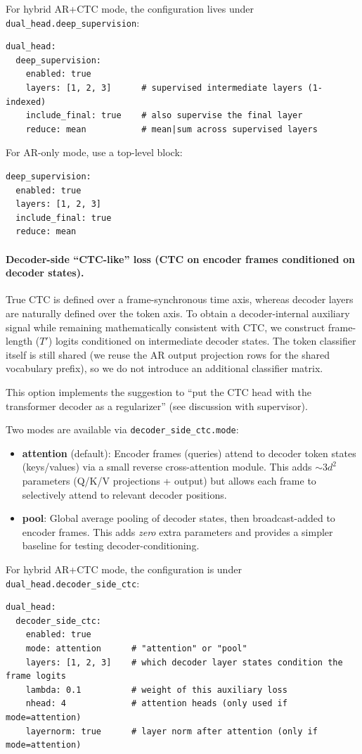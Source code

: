 For hybrid AR+CTC mode, the configuration lives under \texttt{dual\_head.deep\_supervision}:
\begin{verbatim}
dual_head:
  deep_supervision:
    enabled: true
    layers: [1, 2, 3]      # supervised intermediate layers (1-indexed)
    include_final: true    # also supervise the final layer
    reduce: mean           # mean|sum across supervised layers
\end{verbatim}

For AR-only mode, use a top-level block:
\begin{verbatim}
deep_supervision:
  enabled: true
  layers: [1, 2, 3]
  include_final: true
  reduce: mean
\end{verbatim}

\paragraph{Decoder-side ``CTC-like'' loss (CTC on encoder frames conditioned on decoder states).}
True CTC is defined over a frame-synchronous time axis, whereas decoder layers are naturally defined over the token axis.
To obtain a decoder-internal auxiliary signal while remaining mathematically consistent with CTC, we construct frame-length ($T'$) logits conditioned on intermediate decoder states.
The token classifier itself is still shared (we reuse the AR output projection rows for the shared vocabulary prefix), so we do not introduce an additional classifier matrix.

This option implements the suggestion to ``put the CTC head with the transformer decoder as a regularizer'' (see discussion with supervisor).

Two modes are available via \texttt{decoder\_side\_ctc.mode}:
\begin{itemize}
  \item \textbf{attention} (default): Encoder frames (queries) attend to decoder token states (keys/values) via a small reverse cross-attention module. This adds $\sim 3 d^2$ parameters (Q/K/V projections + output) but allows each frame to selectively attend to relevant decoder positions.
  \item \textbf{pool}: Global average pooling of decoder states, then broadcast-added to encoder frames. This adds \emph{zero} extra parameters and provides a simpler baseline for testing decoder-conditioning.
\end{itemize}

For hybrid AR+CTC mode, the configuration is under \texttt{dual\_head.decoder\_side\_ctc}:
\begin{verbatim}
dual_head:
  decoder_side_ctc:
    enabled: true
    mode: attention      # "attention" or "pool"
    layers: [1, 2, 3]    # which decoder layer states condition the frame logits
    lambda: 0.1          # weight of this auxiliary loss
    nhead: 4             # attention heads (only used if mode=attention)
    layernorm: true      # layer norm after attention (only if mode=attention)
\end{verbatim}


